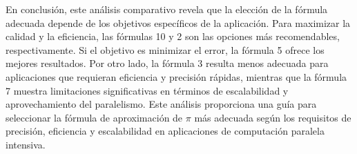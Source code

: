 \documentclass[conference, a4paper]{IEEEtran}
\begin{document}
En conclusión, este análisis comparativo revela que la elección de la fórmula adecuada depende de los objetivos específicos de la aplicación. Para maximizar la calidad y la eficiencia, las fórmulas 10 y 2 son las opciones más recomendables, respectivamente. Si el objetivo es minimizar el error, la fórmula 5 ofrece los mejores resultados. Por otro lado, la fórmula 3 resulta menos adecuada para aplicaciones que requieran eficiencia y precisión rápidas, mientras que la fórmula 7 muestra limitaciones significativas en términos de escalabilidad y aprovechamiento del paralelismo. Este análisis proporciona una guía para seleccionar la fórmula de aproximación de \(\pi\) más adecuada según los requisitos de precisión, eficiencia y escalabilidad en aplicaciones de computación paralela intensiva.
\end{document}
